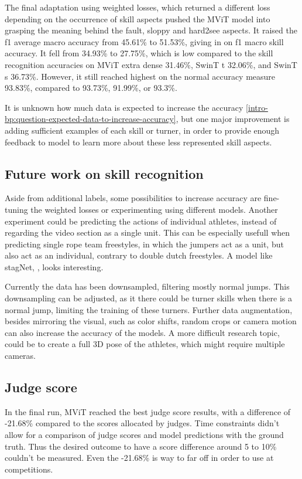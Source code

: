 The final adaptation using weighted losses, which returned a different loss depending on the occurrence of skill aspects pushed the MViT model into grasping the meaning behind the fault, sloppy and hard2see aspects. It raised the f1 average macro accuracy from 45.61\% to 51.53\%, giving in on f1 macro skill accuracy. It fell from 34.93\% to 27.75\%, which is low compared to the skill recognition accuracies on MViT extra dense 31.46\%, SwinT t 32.06\%, and SwinT s 36.73\%. However, it still reached highest on the normal accuracy measure 93.83\%, compared to 93.73\%, 91.99\%, or 93.3\%.

It is unknown how much data is expected to increase the accuracy \ref{intro-bp:question-expected-data-to-increase-accuracy}, but one major improvement is adding sufficient examples of each skill or turner, in order to provide enough feedback to model to learn more about these less represented skill aspects.

\subsection{Future work on skill recognition}

Aside from additional labels, some possibilities to increase accuracy are fine-tuning the weighted losses or experimenting using different models. Another experiment could be predicting the actions of individual athletes, instead of regarding the video section as a single unit. This can be especially usefull when predicting single rope team freestyles, in which the jumpers act as a unit, but also act as an individual, contrary to double dutch freestyles. A model like stagNet, \autocite{Qi_2020}, looks interesting. 

Currently the data has been downsampled, filtering mostly normal jumps. This downsampling can be adjusted, as it there could be turner skills when there is a normal jump, limiting the training of these turners. Further data augmentation, besides mirroring the visual, such as color shifts, random crops or camera motion can also increase the accuracy of the models. A more difficult research topic, could be to create a full 3D pose of the athletes, which might require multiple cameras. 


\subsection{Judge score}

In the final run, MViT reached the best judge score results, with a difference of -21.68\% compared to the scores allocated by judges.
Time constraints didn't allow for a comparison of judge scores and model predictions with the ground truth. Thus the desired outcome to have a score difference around 5 to 10\% couldn't be measured. Even the -21.68\% is way to far off in order to use at competitions.

